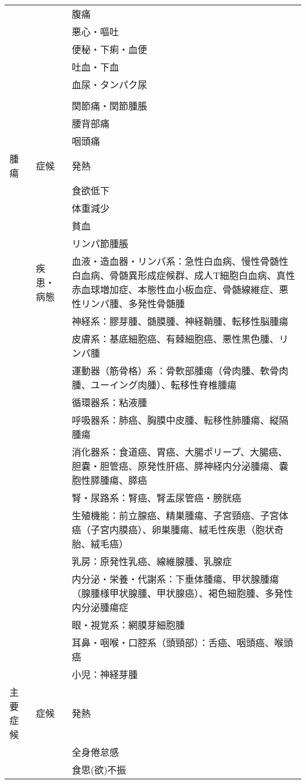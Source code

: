 \begin{xltabular}{\linewidth}{XXX}
 &  & 腹痛 \\
 &  & 悪心・嘔吐 \\
 &  & 便秘・下痢・血便 \\
 &  & 吐血・下血 \\
 &  & 血尿・タンパク尿 \\
 &  &  \\
 &  & 関節痛・関節腫脹 \\
 &  & 腰背部痛 \\
 &  & 咽頭痛 \\
腫瘍 & 症候 & 発熱 \\
 &  & 食欲低下 \\
 &  & 体重減少 \\
 &  & 貧血 \\
 &  & リンパ節腫脹 \\
 & 疾患・病態 & 血液・造血器・リンパ系：急性白血病、慢性骨髄性白血病、骨髄異形成症候群、成人T細胞白血病、真性赤血球増加症、本態性血小板血症、骨髄線維症、悪性リンパ腫、多発性骨髄腫 \\
 &  & 神経系：膠芽腫、髄膜腫、神経鞘腫、転移性脳腫瘍 \\
 &  & 皮膚系：基底細胞癌、有棘細胞癌、悪性黒色腫、リンパ腫 \\
 &  & 運動器（筋骨格）系：骨軟部腫瘍（骨肉腫、軟骨肉腫、ユーイング肉腫）、転移性脊椎腫瘍 \\
 &  & 循環器系：粘液腫 \\
 &  & 呼吸器系：肺癌、胸膜中皮腫、転移性肺腫瘍、縦隔腫瘍 \\
 &  & 消化器系：食道癌、胃癌、大腸ポリープ、大腸癌、胆嚢・胆管癌、原発性肝癌、膵神経内分泌腫瘍、嚢胞性膵腫瘍、膵癌 \\
 &  & 腎・尿路系：腎癌、腎盂尿管癌・膀胱癌 \\
 &  & 生殖機能：前立腺癌、精巣腫瘍、子宮頸癌、子宮体癌（子宮内膜癌）、卵巣腫瘍、絨毛性疾患（胞状奇胎、絨毛癌） \\
 &  & 乳房：原発性乳癌、線維腺腫、乳腺症 \\
 &  & 内分泌・栄養・代謝系：下垂体腫瘍、甲状腺腫瘍（腺腫様甲状腺腫、甲状腺癌）、褐色細胞腫、多発性内分泌腫瘍症 \\
 &  & 眼・視覚系：網膜芽細胞腫 \\
 &  & 耳鼻・咽喉・口腔系（頭頸部）：舌癌、咽頭癌、喉頭癌 \\
 &  & 小児：神経芽腫 \\
主要症候 & 症候 & 発熱 \\
 &  & 全身倦怠感 \\
 &  & 食思(欲)不振 \\

\end{xltabular}

